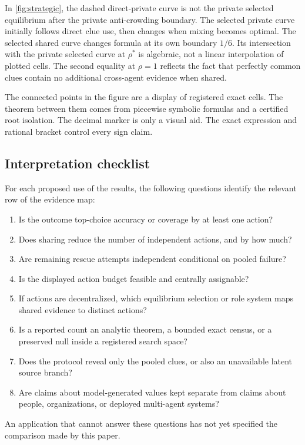\documentclass[12pt]{article}
\theoremstyle{definition}
\begin{document}
In \cref{fig:strategic}, the dashed direct-private curve is not the private
selected equilibrium after the private anti-crowding boundary. The selected
private curve initially follows direct clue use, then changes when mixing becomes
optimal. The selected shared curve changes formula at its own boundary $1/6$.
Its intersection with the private selected curve at $\rho^*$ is algebraic, not a
linear interpolation of plotted cells. The second equality at $\rho=1$ reflects
the fact that perfectly common clues contain no additional cross-agent evidence
when shared.

The connected points in the figure are a display of registered exact cells. The
theorem between them comes from piecewise symbolic formulas and a certified root
isolation. The decimal marker is only a visual aid. The exact expression and
rational bracket control every sign claim.

\subsection*{Interpretation checklist}

For each proposed use of the results, the following questions identify the
relevant row of the evidence map:
\begin{enumerate}[leftmargin=2em]
\item Is the outcome top-choice accuracy or coverage by at least one action?
\item Does sharing reduce the number of independent actions, and by how much?
\item Are remaining rescue attempts independent conditional on pooled failure?
\item Is the displayed action budget feasible and centrally assignable?
\item If actions are decentralized, which equilibrium selection or role system
      maps shared evidence to distinct actions?
\item Is a reported count an analytic theorem, a bounded exact census, or a
      preserved null inside a registered search space?
\item Does the protocol reveal only the pooled clues, or also an unavailable
      latent source branch?
\item Are claims about model-generated values kept separate from claims about
      people, organizations, or deployed multi-agent systems?
\end{enumerate}
An application that cannot answer these questions has not yet specified the
comparison made by this paper.
\end{document}
